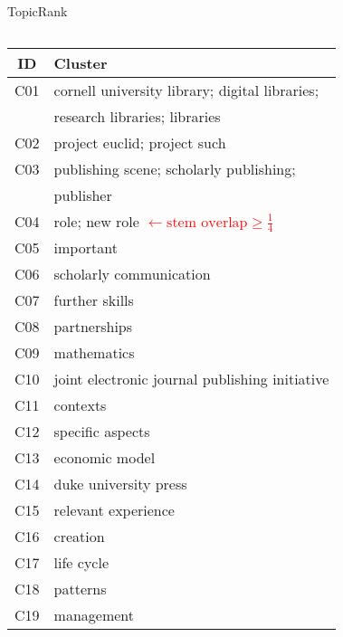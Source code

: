 \begin{frame}{TopicRank}
\begin{columns}
\begin{column}{.55\textwidth}
{{{{
                }
              }{ %
                \scriptsize
                \begin{tabular}{cl}
                  \toprule
                  ID & Cluster\\
                  \midrule
                  \multirow{1}{*}{C01} & cornell university library; digital libraries;\\
                  & research libraries; libraries\\
                  C02 & project euclid; project such\\
                  \multirow{1}{*}{C03} & publishing scene; scholarly publishing;\\
                  & publisher\\
              C04 & role; new role \textcolor{red}{$\longleftarrow \text{stem overlap} \geq \frac{1}{4}$}\\
                  C05 & important\\
                  C06 & scholarly communication\\
                  C07 & further skills\\
                  C08 & partnerships\\
                  C09 & mathematics\\
                  C10 & joint electronic journal publishing initiative\\
                  C11 & contexts\\
                  C12 & specific aspects\\
                  C13 & economic model\\
                  C14 & duke university press\\
                  C15 & relevant experience\\
                  C16 & creation\\
                  C17 & life cycle\\
                  C18 & patterns\\
                  C19 & management\\
                  \bottomrule
                \end{tabular}
              }
}}
\end{column}
\end{columns}
\end{frame}
